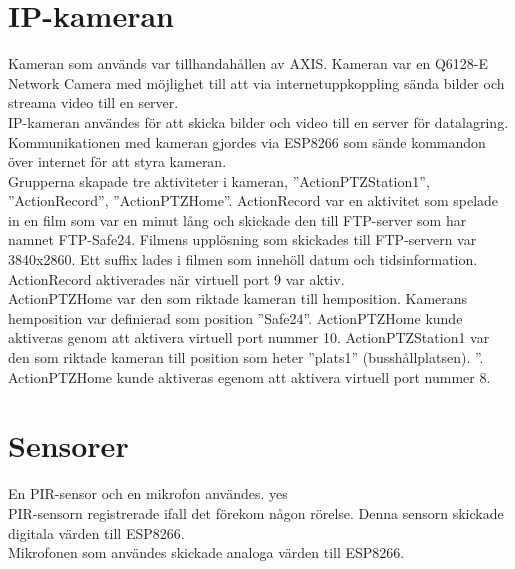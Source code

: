 \section{IP-kameran}
Kameran som används var tillhandahållen av AXIS. Kameran var en Q6128-E Network Camera med möjlighet till att via  internetuppkoppling sända bilder och streama video till en server.\\

IP-kameran användes för att skicka bilder och video till en server för datalagring.\\

Kommunikationen med kameran gjordes via ESP8266 som sände kommandon över internet för att styra kameran.\\

Grupperna skapade tre aktiviteter i kameran, ”ActionPTZStation1”, ”ActionRecord”, ”ActionPTZHome”.
ActionRecord var en aktivitet som spelade in en film som var en minut lång och skickade den till FTP-server som har namnet FTP-Safe24. Filmens upplösning som skickades till FTP-servern var 3840x2860. Ett suffix lades i filmen som innehöll datum och tidsinformation. ActionRecord aktiverades när virtuell port 9 var aktiv.\\
ActionPTZHome var den som riktade kameran till hemposition. Kamerans hemposition var definierad som position ”Safe24”. ActionPTZHome kunde aktiveras genom att aktivera virtuell port nummer 10.
ActionPTZStation1 var den som riktade kameran till position som heter ”plats1” (busshållplatsen). ”. ActionPTZHome kunde aktiveras egenom att aktivera virtuell port nummer 8.


\section{Sensorer}
En PIR-sensor och en mikrofon användes. yes\\

PIR-sensorn registrerade ifall det förekom någon rörelse. Denna sensorn skickade digitala värden till ESP8266.\\

Mikrofonen som användes skickade analoga värden till ESP8266.\\






 



